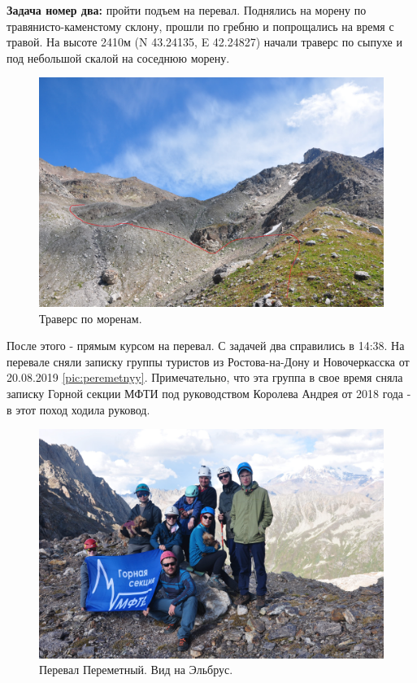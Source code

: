 \textbf{Задача номер два:} пройти подъем на перевал. Поднялись на морену по травянисто-каменстому склону, прошли по гребню и попрощались на время с травой. На высоте 2410м (N 43.24135, E 42.24827) начали траверс по сыпухе и под небольшой скалой на соседнюю морену.
\begin{figure}[h!]
	\centering
	\includegraphics[width=0.7\linewidth]{../pics/DSC_0280.jpg}
	\caption{Траверс по моренам.}
	\label{fig:DSC_0280}
\end{figure} 
После этого - прямым курсом на перевал. С задачей два справились в 14:38. На перевале сняли записку группы туристов из Ростова-на-Дону и Новочеркасска от 20.08.2019 \ref{pic:peremetnyy}. Примечательно, что эта группа в свое время сняла записку Горной секции МФТИ под руководством Королева Андрея от 2018 года - в этот поход ходила руковод.

\begin{figure}[h!]
	\centering
	\includegraphics[width=0.7\linewidth]{../pics/DSC_0419 2.jpg}
	\caption{Перевал Переметный. Вид на Эльбрус.}
	\label{fig:DSC_0419 2}
\end{figure} 

